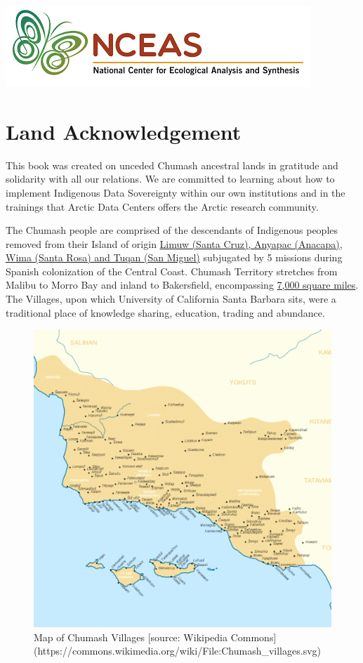 \documentclass[
]{book}
\begin{document}
\includegraphics[width=0.49\linewidth]{images/nceas}

\hypertarget{land-acknowledgement}{%
\section*{Land Acknowledgement}\label{land-acknowledgement}}

This book was created on unceded Chumash ancestral lands in gratitude and solidarity with all our relations. We are committed to learning about how to implement Indigenous Data Sovereignty within our own institutions and in the trainings that Arctic Data Centers offers the Arctic research community.

The Chumash people are comprised of the descendants of Indigenous peoples removed from their Island of origin \href{https://external.as.ucsb.edu/land-acknowledgment/}{Limuw (Santa Cruz), Anyapac (Anacapa), Wima (Santa Rosa) and Tuqan (San Miguel)} subjugated by 5 missions during Spanish colonization of the Central Coast. Chumash Territory stretches from Malibu to Morro Bay and inland to Bakersfield, encompassing \href{https://www.santaynezchumash.org/chumash-history}{7,000 square miles}. The Villages, upon which University of California Santa Barbara sits, were a traditional place of knowledge sharing, education, trading and abundance.

\begin{figure}
\includegraphics[width=14.22in]{images/chumash_territory} \caption{Map of Chumash Villages [source: Wikipedia Commons](https://commons.wikimedia.org/wiki/File:Chumash_villages.svg)}\label{fig:unnamed-chunk-3}
\end{figure}
\end{document}
